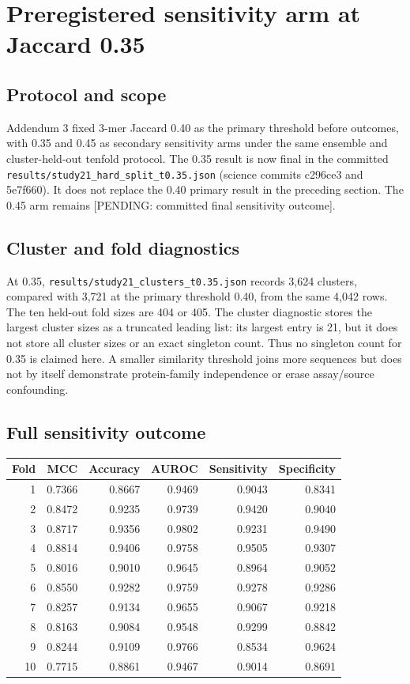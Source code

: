 \clearpage
\section*{Preregistered sensitivity arm at Jaccard 0.35}
\label{sec:sensitivity035}
\subsection*{Protocol and scope}
Addendum 3 fixed 3-mer Jaccard 0.40 as the primary threshold before outcomes, with 0.35 and 0.45 as secondary sensitivity arms under the same ensemble and cluster-held-out tenfold protocol. The 0.35 result is now final in the committed \texttt{results/study21\_hard\_split\_t0.35.json} (science commits c296ce3 and 5e7f660). It does not replace the 0.40 primary result in the preceding section. The 0.45 arm remains [PENDING: committed final sensitivity outcome].

\subsection*{Cluster and fold diagnostics}
At 0.35, \texttt{results/study21\_clusters\_t0.35.json} records 3,624 clusters, compared with 3,721 at the primary threshold 0.40, from the same 4,042 rows. The ten held-out fold sizes are 404 or 405. The cluster diagnostic stores the largest cluster sizes as a truncated leading list: its largest entry is 21, but it does not store all cluster sizes or an exact singleton count. Thus no singleton count for 0.35 is claimed here. A smaller similarity threshold joins more sequences but does not by itself demonstrate protein-family independence or erase assay/source confounding.

\subsection*{Full sensitivity outcome}
\begin{center}\small\begin{tabular}{rrrrrr}\hline
Fold & MCC & Accuracy & AUROC & Sensitivity & Specificity\\\hline
1 & 0.7366 & 0.8667 & 0.9469 & 0.9043 & 0.8341\\
2 & 0.8472 & 0.9235 & 0.9739 & 0.9420 & 0.9040\\
3 & 0.8717 & 0.9356 & 0.9802 & 0.9231 & 0.9490\\
4 & 0.8814 & 0.9406 & 0.9758 & 0.9505 & 0.9307\\
5 & 0.8016 & 0.9010 & 0.9645 & 0.8964 & 0.9052\\
6 & 0.8550 & 0.9282 & 0.9759 & 0.9278 & 0.9286\\
7 & 0.8257 & 0.9134 & 0.9655 & 0.9067 & 0.9218\\
8 & 0.8163 & 0.9084 & 0.9548 & 0.9299 & 0.8842\\
9 & 0.8244 & 0.9109 & 0.9766 & 0.8534 & 0.9624\\
10 & 0.7715 & 0.8861 & 0.9467 & 0.9014 & 0.8691\\\hline
\end{tabular}\end{center}

